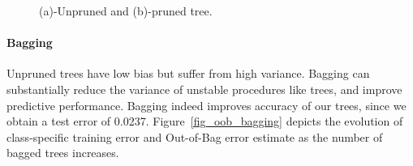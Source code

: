 \begin{figure}[htb]
	\hfill%
	\hfill%
	\hfill\null%
	\caption{(a)-Unpruned and (b)-pruned tree.}
	\label{fig_tree}
\end{figure}
\paragraph{Bagging}
Unpruned trees have low bias but suffer from high variance. Bagging can substantially reduce the variance of unstable procedures like trees, and improve predictive performance. Bagging indeed improves accuracy of our trees, since we obtain a test error of \num{0.0237}. Figure~\ref{fig_oob_bagging} depicts the evolution of class-specific training error and Out-of-Bag error estimate as the number of bagged trees increases.
